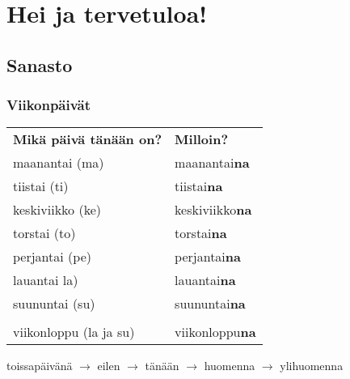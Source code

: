 \documentclass[../päätiedosto/pää.tex]{subfiles}
\begin{document}
\chapter{Hei ja tervetuloa!}
\section{Sanasto}
\subsection{Viikonpäivät}

\begin{tabularx}{\textwidth}{X X}
\textbf{Mikä päivä tänään on?} & \textbf{Milloin?} \\
maanantai (ma)                       & maanantai\textbf{na}       \\
tiistai (ti)                         & tiistai\textbf{na}        \\
keskiviikko (ke)                     & keskiviikko\textbf{na}     \\
torstai (to)                         & torstai\textbf{na}         \\
perjantai (pe)                       & perjantai\textbf{na}       \\
lauantai la)                         & lauantai\textbf{na}        \\
suununtai (su)                       & suununtai\textbf{na}       \\
                                     &                   \\
viikonloppu (la ja su)               & viikonloppu\textbf{na}     \\
\end{tabularx}%
\vspace{2mm}
toissapäivänä $\rightarrow$ eilen $\rightarrow$ tänään $\rightarrow$ huomenna $\rightarrow$ ylihuomenna
\end{document}

